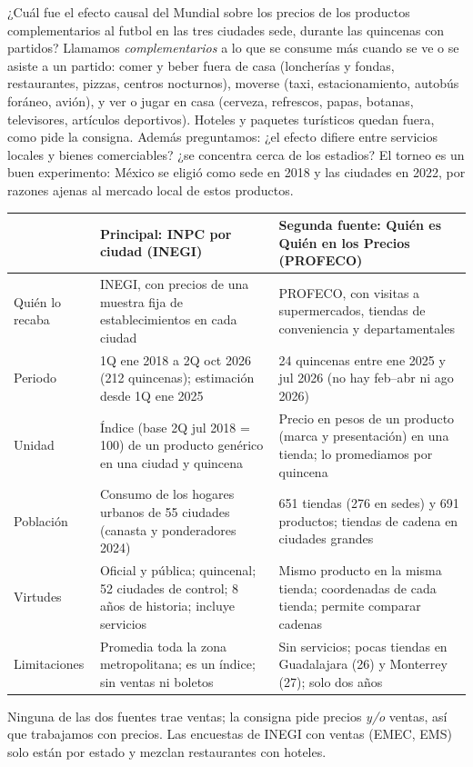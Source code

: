 \documentclass[11pt,letterpaper]{article}
\newcommand{\seccion}[1]{\vspace{4pt}{\large\bfseries #1}\par\vspace{1pt}}
\begin{document}
\newpage
\seccion{(a) Pregunta}
¿Cuál fue el efecto causal del Mundial sobre los precios de los productos complementarios al
futbol en las tres ciudades sede, durante las quincenas con partidos? Llamamos
\emph{complementarios} a lo que se consume más cuando se ve o se asiste a un partido: comer y beber
fuera de casa (loncherías y fondas, restaurantes, pizzas, centros nocturnos), moverse
(taxi, estacionamiento, autobús foráneo, avión), y ver o jugar en casa (cerveza, refrescos, papas,
botanas, televisores, artículos deportivos). Hoteles y paquetes turísticos quedan fuera, como pide
la consigna. Además preguntamos: ¿el efecto difiere entre servicios locales y bienes comerciables?
¿se concentra cerca de los estadios? El torneo es un buen experimento: México se eligió como sede
en 2018 y las ciudades en 2022, por razones ajenas al mercado local de estos productos.

\seccion{(b) Datos}
\begin{center}
\footnotesize
\begin{tabularx}{\textwidth}{@{}p{2.2cm}XX@{}}
\toprule
& \textbf{Principal: INPC por ciudad (INEGI)} & \textbf{Segunda fuente: Quién es Quién en los Precios (PROFECO)} \\
\midrule
Quién lo recaba & INEGI, con precios de una muestra fija de establecimientos en cada ciudad & PROFECO, con visitas a supermercados, tiendas de conveniencia y departamentales \\
Periodo & 1Q ene 2018 a 2Q oct 2026 (212 quincenas); estimación desde 1Q ene 2025 & 24 quincenas entre ene 2025 y jul 2026 (no hay feb--abr ni ago 2026) \\
Unidad & Índice (base 2Q jul 2018 = 100) de un producto genérico en una ciudad y quincena & Precio en pesos de un producto (marca y presentación) en una tienda; lo promediamos por quincena \\
Población & Consumo de los hogares urbanos de 55 ciudades (canasta y ponderadores 2024) & 651 tiendas (276 en sedes) y 691 productos; tiendas de cadena en ciudades grandes \\
Virtudes & Oficial y pública; quincenal; 52 ciudades de control; 8 años de historia; incluye servicios & Mismo producto en la misma tienda; coordenadas de cada tienda; permite comparar cadenas \\
Limitaciones & Promedia toda la zona metropolitana; es un índice; sin ventas ni boletos & Sin servicios; pocas tiendas en Guadalajara (26) y Monterrey (27); solo dos años \\
\bottomrule
\end{tabularx}
\end{center}
\vspace{-4pt}
Ninguna de las dos fuentes trae ventas; la consigna pide precios \emph{y/o} ventas, así que
trabajamos con precios. Las encuestas de INEGI con ventas (EMEC, EMS) solo están por estado y
mezclan restaurantes con hoteles.
\end{document}
